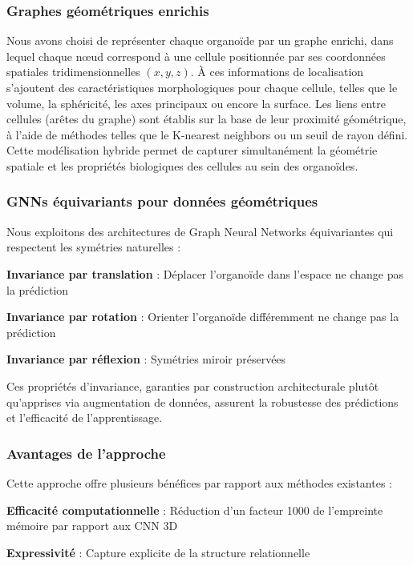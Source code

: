 \subsubsection{Graphes géométriques enrichis}

Nous avons choisi de représenter chaque organoïde par un graphe enrichi, dans lequel chaque nœud correspond à une cellule positionnée par ses coordonnées spatiales tridimensionnelles $(x, y, z)$. À ces informations de localisation s’ajoutent des caractéristiques morphologiques pour chaque cellule, telles que le volume, la sphéricité, les axes principaux ou encore la surface. Les liens entre cellules (arêtes du graphe) sont établis sur la base de leur proximité géométrique, à l’aide de méthodes telles que le K-nearest neighbors ou un seuil de rayon défini. Cette modélisation hybride permet de capturer simultanément la géométrie spatiale et les propriétés biologiques des cellules au sein des organoïdes.

\subsubsection{GNNs équivariants pour données géométriques}

Nous exploitons des architectures de Graph Neural Networks équivariantes qui respectent les symétries naturelles :

\textbf{Invariance par translation} : Déplacer l'organoïde dans l'espace ne change pas la prédiction

\textbf{Invariance par rotation} : Orienter l'organoïde différemment ne change pas la prédiction

\textbf{Invariance par réflexion} : Symétries miroir préservées

Ces propriétés d'invariance, garanties par construction architecturale plutôt qu'apprises via augmentation de données, assurent la robustesse des prédictions et l'efficacité de l'apprentissage.

\subsubsection{Avantages de l'approche}

Cette approche offre plusieurs bénéfices par rapport aux méthodes existantes :

\textbf{Efficacité computationnelle} : Réduction d'un facteur 1000 de l'empreinte mémoire par rapport aux CNN 3D

\textbf{Expressivité} : Capture explicite de la structure relationnelle


